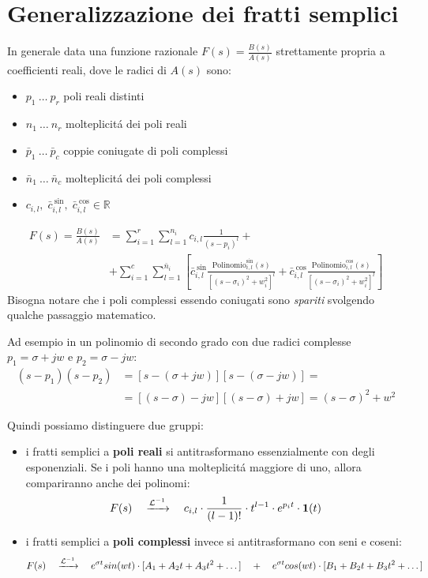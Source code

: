 \documentclass[../main.tex]{subfiles}
\begin{document}
	\section{Generalizzazione dei fratti semplici}
		In generale data una funzione razionale $ F(s) = \frac{B(s)}{A(s)} $ strettamente propria a coefficienti reali, dove le radici di $ A(s) $ sono:
		\begin{itemize}
			\item
				$ p_1\ \dots\ p_r $ \quad poli reali distinti
			\item
				$ n_1\ \dots\ n_r $ \quad molteplicit\'{a} dei poli reali
			\item
				$ \bar{p}_1\ \dots\ \bar{p}_c $ \quad coppie coniugate di poli complessi
			\item
				$ \bar{n}_1\ \dots\ \bar{n}_c $ \quad molteplicit\'{a} dei poli complessi
			\item
				$ c_{i,l},\; \bar{c}_{i,l}^{\ \sin},\; \bar{c}_{i,l}^{\ \cos} \in \mathbb{R} $
		\end{itemize}
		\begin{align}
			F(s) = \frac{B(s)}{A(s)} &= \sum_{i=1}^{r} \sum_{l=1}^{n_i} c_{i,l} \frac{1}{(s-p_i)^l} +
			\\\nonumber
			&+ \sum_{i=1}^{c} \sum_{l=1}^{\bar{n}_i} \left[ \bar{c}_{i,l}^{\ \sin} \frac{\text{Polinomio}_{i,l}^{\sin}(s)}{[(s - \sigma_i)^2 + w_i^2]^l} + \bar{c}_{i,l}^{\ \cos} \frac{\text{Polinomio}_{i,l}^{\cos}(s)}{[(s - \sigma_i)^2 + w_i^2]^l} \right]
		\end{align}
		Bisogna notare che i poli complessi essendo coniugati sono \textit{spariti} svolgendo qualche passaggio matematico.
		
		Ad esempio in un polinomio di secondo grado con due radici complesse $ p_1 = \sigma + jw $ e $ p_2 = \sigma - jw $:
		\[
			\begin{aligned}
				(s - p_1)(s - p_2) &= [s - (\sigma + jw)][s - (\sigma - jw)] =\\
				&= [(s - \sigma) - jw][(s - \sigma) + jw] = (s - \sigma)^2 + w^2
			\end{aligned}
		\]
		
		Quindi possiamo distinguere due gruppi:
		\begin{itemize}
			\item
				i fratti semplici a \textbf{poli reali} si antitrasformano essenzialmente con degli esponenziali. Se i poli hanno una molteplicit\'{a} maggiore di uno, allora compariranno anche dei polinomi:
			\[
				F(s) \quad \xrightarrow{\mathcal{L}^{-1}} \quad c_{i,l} \cdot \frac{1}{(l-1)!} \cdot t^{l-1} \cdot e^{p_i t} \cdot \textbf{1}(t)
			\]
			\item
				i fratti semplici a \textbf{poli complessi} invece si antitrasformano con seni e coseni:
			\[
				F(s) \quad \xrightarrow{\mathcal{L}^{-1}} \quad e^{\sigma t} sin(wt) \cdot [A_1 + A_2 t + A_3 t^2 + \dots] \quad + \quad e^{\sigma t} cos(wt) \cdot [B_1 + B_2 t + B_3 t^2 + \dots]
			\]
		\end{itemize}
\end{document}
